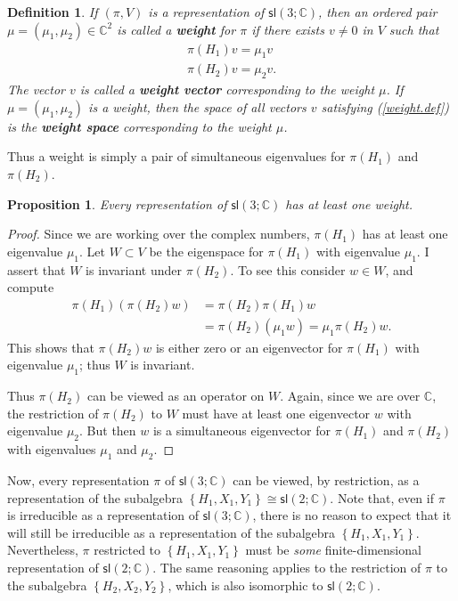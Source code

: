 \documentclass[12pt]{amsbook}
\theoremstyle{plain}
\newtheorem{definition}[theorem]{Definition}
\newtheorem{proposition}[theorem]{Proposition}
\numberwithin{equation}{chapter}
\numberwithin{theorem}{chapter}
\begin{document}
\begin{definition}
If $\left(  \pi,V\right)  $ is a representation of $\mathsf{sl}\left(
3;\mathbb{C}\right)  $, then an ordered pair $\mu=\left(  \mu_{1},\mu
_{2}\right)  \in\mathbb{C}^{2}$ is called a \textbf{weight} for $\pi$ if there
exists $v\neq0$ in $V$ such that
\begin{align}
\pi(H_{1})v=\mu_{1}v\nonumber\\
\pi(H_{2})v=\mu_{2}v\text{.}\label{weight.def}%
\end{align}
The vector $v$ is called a \textbf{weight vector} corresponding to the weight
$\mu$. If $\mu=\left(  \mu_{1},\mu_{2}\right)  $ is a weight, then the space
of all vectors $v$ satisfying (\ref{weight.def}) is the \textbf{weight space}
corresponding to the weight $\mu$.
\end{definition}

Thus a weight is simply a pair of simultaneous eigenvalues for $\pi(H_{1})$
and $\pi(H_{2})$.

\begin{proposition}
\label{weight.exist}Every representation of $\mathsf{sl}\left(  3;\mathbb{C}%
\right)  $ has at least one weight.
\end{proposition}

\begin{proof}
Since we are working over the complex numbers, $\pi(H_{1})$ has at least one
eigenvalue $\mu_{1}$. Let $W\subset V$ be the eigenspace for $\pi(H_{1})$ with
eigenvalue $\mu_{1}$. I assert that $W$ is invariant under $\pi(H_{2})$. To
see this consider $w\in W$, and compute
\begin{align*}
\pi(H_{1})\left(  \pi(H_{2})w\right)    & =\pi(H_{2})\pi(H_{1})w\\
& =\pi(H_{2})\left(  \mu_{1}w\right)  =\mu_{1}\pi(H_{2})w\text{.}%
\end{align*}
This shows that $\pi(H_{2})w$ is either zero or an eigenvector for $\pi
(H_{1})$ with eigenvalue $\mu_{1}$; thus $W$ is invariant.

Thus $\pi(H_{2})$ can be viewed as an operator on $W$. Again, since we are
over $\mathbb{C}$, the restriction of $\pi(H_{2})$ to $W$ must have at least
one eigenvector $w$ with eigenvalue $\mu_{2}$. But then $w$ is a simultaneous
eigenvector for $\pi(H_{1})$ and $\pi(H_{2})$ with eigenvalues $\mu_{1}$ and
$\mu_{2}$.
\end{proof}

Now, every representation $\pi$ of $\mathsf{sl}\left(  3;\mathbb{C}\right)  $
can be viewed, by restriction, as a representation of the subalgebra $\left\{
H_{1},X_{1},Y_{1}\right\}  \cong\mathsf{sl}(2;\mathbb{C})$. Note that, even if
$\pi$ is irreducible as a representation of $\mathsf{sl}\left(  3;\mathbb{C}%
\right)  $, there is no reason to expect that it will still be irreducible as
a representation of the subalgebra $\left\{  H_{1},X_{1},Y_{1}\right\}  $.
Nevertheless, $\pi$ restricted to $\left\{  H_{1},X_{1},Y_{1}\right\}  $ must
be \textit{some} finite-dimensional representation of $\mathsf{sl}%
(2;\mathbb{C})$. The same reasoning applies to the restriction of $\pi$ to the
subalgebra $\left\{  H_{2},X_{2},Y_{2}\right\}  $, which is also isomorphic to
$\mathsf{sl}(2;\mathbb{C})$.
\end{document}
